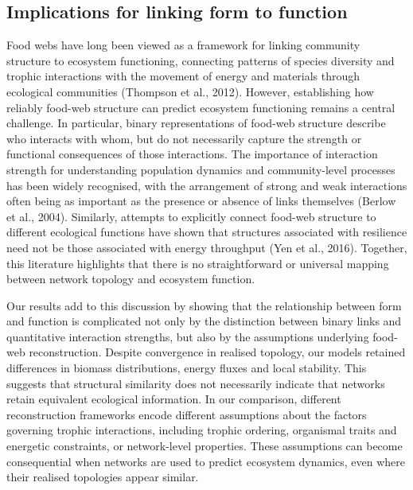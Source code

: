 \documentclass[
]{article}
\begin{document}
\subsection{Implications for linking form to
function}\label{implications-for-linking-form-to-function}

Food webs have long been viewed as a framework for linking community
structure to ecosystem functioning, connecting patterns of species
diversity and trophic interactions with the movement of energy and
materials through ecological communities (Thompson et al., 2012).
However, establishing how reliably food-web structure can predict
ecosystem functioning remains a central challenge. In particular, binary
representations of food-web structure describe who interacts with whom,
but do not necessarily capture the strength or functional consequences
of those interactions. The importance of interaction strength for
understanding population dynamics and community-level processes has been
widely recognised, with the arrangement of strong and weak interactions
often being as important as the presence or absence of links themselves
(Berlow et al., 2004). Similarly, attempts to explicitly connect
food-web structure to different ecological functions have shown that
structures associated with resilience need not be those associated with
energy throughput (Yen et al., 2016). Together, this literature
highlights that there is no straightforward or universal mapping between
network topology and ecosystem function.

Our results add to this discussion by showing that the relationship
between form and function is complicated not only by the distinction
between binary links and quantitative interaction strengths, but also by
the assumptions underlying food-web reconstruction. Despite convergence
in realised topology, our models retained differences in biomass
distributions, energy fluxes and local stability. This suggests that
structural similarity does not necessarily indicate that networks retain
equivalent ecological information. In our comparison, different
reconstruction frameworks encode different assumptions about the factors
governing trophic interactions, including trophic ordering, organismal
traits and energetic constraints, or network-level properties. These
assumptions can become consequential when networks are used to predict
ecosystem dynamics, even where their realised topologies appear similar.
\end{document}
